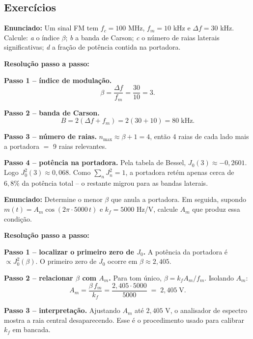 \documentclass[11pt,a4paper]{article}
\begin{document}
\subsection{Exercícios}

\begin{exercicio}
\textbf{Enunciado:} Um sinal FM tem $f_c=100$ MHz, $f_m=10$ kHz e $\Delta f=30$ kHz. Calcule:
\emph{a} o índice $\beta$;
\emph{b} a banda de Carson;
\emph{c} o número de raias laterais significativas;
\emph{d} a fração de potência contida na portadora.

\textbf{Resolução passo a passo:}

\textbf{Passo 1 -- índice de modulação.}
\[
  \beta = \frac{\Delta f}{f_m} = \frac{30}{10} = 3.
\]

\textbf{Passo 2 -- banda de Carson.}
\[
  B = 2(\Delta f + f_m) = 2(30+10) = 80\;\text{kHz}.
\]

\textbf{Passo 3 -- número de raias.}
$n_{\max} \approx \beta+1 = 4$, então 4 raias de cada lado mais a portadora $=$ 9 raias relevantes.

\textbf{Passo 4 -- potência na portadora.}
Pela tabela de Bessel, $J_0(3)\approx -0{,}2601$. Logo $J_0^2(3)\approx 0{,}068$. Como $\sum_n J_n^2 = 1$, a portadora retém apenas cerca de $6{,}8\%$ da potência total -- o restante migrou para as bandas laterais.
\end{exercicio}

\begin{exercicio}
\textbf{Enunciado:} Determine o menor $\beta$ que anula a portadora. Em seguida, supondo $m(t)=A_m\cos(2\pi\!\cdot\!5000\,t)$ e $k_f=5000$ Hz/V, calcule $A_m$ que produz essa condição.

\textbf{Resolução passo a passo:}

\textbf{Passo 1 -- localizar o primeiro zero de $J_0$.}
A potência da portadora é $\propto J_0^2(\beta)$. O primeiro zero de $J_0$ ocorre em $\beta \approx 2{,}405$.

\textbf{Passo 2 -- relacionar $\beta$ com $A_m$.}
Para tom único, $\beta = k_f A_m/f_m$. Isolando $A_m$:
\[
  A_m = \frac{\beta\, f_m}{k_f} = \frac{2{,}405 \cdot 5000}{5000} \;=\; 2{,}405\;\text{V}.
\]

\textbf{Passo 3 -- interpretação.}
Ajustando $A_m$ até $2{,}405$ V, o analisador de espectro mostra a raia central desaparecendo. Esse é o procedimento usado para calibrar $k_f$ em bancada.
\end{exercicio}
\end{document}
